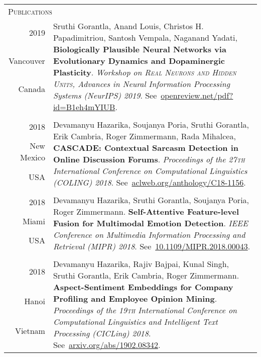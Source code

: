 \documentclass[a4paper,10pt]{article}
\begin{document}
\begin{tabularx}{\textwidth}{r|X}
\multicolumn{2}{l}{\LARGE{\textsc{Publications}}}\\[2ex]
\textsc{2019} &\multirow{5}{=}{Sruthi Gorantla, Anand Louis, Christos H. Papadimitriou, Santosh Vempala, Naganand Yadati, \textbf{Biologically Plausible Neural Networks via Evolutionary Dynamics and Dopaminergic Plasticity}. \textit{Workshop on \textsc{Real Neurons and Hidden Units}, Advances in Neural Information Processing Systems (NeurIPS) 2019}. See~\href{https://openreview.net/pdf?id=B1eh4mYIUB}{openreview.net/pdf?id=B1eh4mYIUB}.}\\
Vancouver & \\
Canada &\\
&\\
&\\
\multicolumn{2}{c}{} \\
\textsc{2018} &\multirow{4}{=}{Devamanyu Hazarika, Soujanya Poria, Sruthi Gorantla, Erik Cambria, Roger Zimmermann, Rada Mihalcea, \textbf{CASCADE: Contextual Sarcasm Detection in Online Discussion Forums}. \textit{Proceedings of the 27\textsc{th} International Conference on Computational Linguistics (COLING) 2018}. See~\href{https://www.aclweb.org/anthology/C18-1156}{aclweb.org/anthology/C18-1156}.}\\
New Mexico & \\
USA &\\
&\\
\multicolumn{2}{c}{} \\
\textsc{2018} &\multirow{4}{=}{Devamanyu Hazarika, Sruthi Gorantla, Soujanya Poria, Roger Zimmermann. 
\textbf{Self-Attentive Feature-level Fusion for Multimodal Emotion Detection}. \textit{ IEEE Conference on Multimedia Information Processing and Retrieval (MIPR) 2018}. See~\href{https://ieeexplore.ieee.org/document/8396999}{10.1109/MIPR.2018.00043}.}\\
Miami & \\
USA &\\
&\\
\multicolumn{2}{c}{} \\
\textsc{2018} &\multirow{4}{=}{Devamanyu Hazarika, Rajiv Bajpai, Kunal Singh, Sruthi Gorantla, Erik Cambria, Roger Zimmermann. \textbf{Aspect-Sentiment Embeddings for Company Profiling and Employee Opinion Mining}. \textit{Proceedings of the 19\textsc{th} International Conference on Computational Linguistics and Intelligent Text Processing (CICLing) 2018}. See~\href{http://arxiv.org/abs/1902.08342}{arxiv.org/abs/1902.08342}.}\\
Hanoi & \\
Vietnam &\\
&\\



\end{tabularx}
\end{document}
